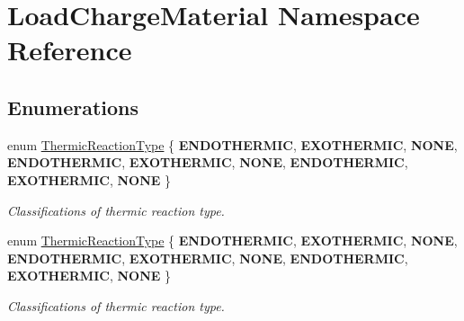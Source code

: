 \hypertarget{namespace_load_charge_material}{}\section{Load\+Charge\+Material Namespace Reference}
\label{namespace_load_charge_material}
\subsection*{Enumerations}
\begin{DoxyCompactItemize}
\item 
\mbox{\label{namespace_load_charge_material_a51d4263e865a5d86236622dd3fe23fd1}} 
enum \hyperlink{namespace_load_charge_material_a51d4263e865a5d86236622dd3fe23fd1}{Thermic\+Reaction\+Type} \{ \newline
{\bfseries E\+N\+D\+O\+T\+H\+E\+R\+M\+IC}, 
{\bfseries E\+X\+O\+T\+H\+E\+R\+M\+IC}, 
{\bfseries N\+O\+NE}, 
{\bfseries E\+N\+D\+O\+T\+H\+E\+R\+M\+IC}, 
\newline
{\bfseries E\+X\+O\+T\+H\+E\+R\+M\+IC}, 
{\bfseries N\+O\+NE}, 
{\bfseries E\+N\+D\+O\+T\+H\+E\+R\+M\+IC}, 
{\bfseries E\+X\+O\+T\+H\+E\+R\+M\+IC}, 
\newline
{\bfseries N\+O\+NE}
 \}\begin{DoxyCompactList}\small\item\em Classifications of thermic reaction type. \end{DoxyCompactList}
\item 
\mbox{\label{namespace_load_charge_material_a51d4263e865a5d86236622dd3fe23fd1}} 
enum \hyperlink{namespace_load_charge_material_a51d4263e865a5d86236622dd3fe23fd1}{Thermic\+Reaction\+Type} \{ \newline
{\bfseries E\+N\+D\+O\+T\+H\+E\+R\+M\+IC}, 
{\bfseries E\+X\+O\+T\+H\+E\+R\+M\+IC}, 
{\bfseries N\+O\+NE}, 
{\bfseries E\+N\+D\+O\+T\+H\+E\+R\+M\+IC}, 
\newline
{\bfseries E\+X\+O\+T\+H\+E\+R\+M\+IC}, 
{\bfseries N\+O\+NE}, 
{\bfseries E\+N\+D\+O\+T\+H\+E\+R\+M\+IC}, 
{\bfseries E\+X\+O\+T\+H\+E\+R\+M\+IC}, 
\newline
{\bfseries N\+O\+NE}
 \}\begin{DoxyCompactList}\small\item\em Classifications of thermic reaction type. \end{DoxyCompactList}

\end{DoxyCompactItemize}

